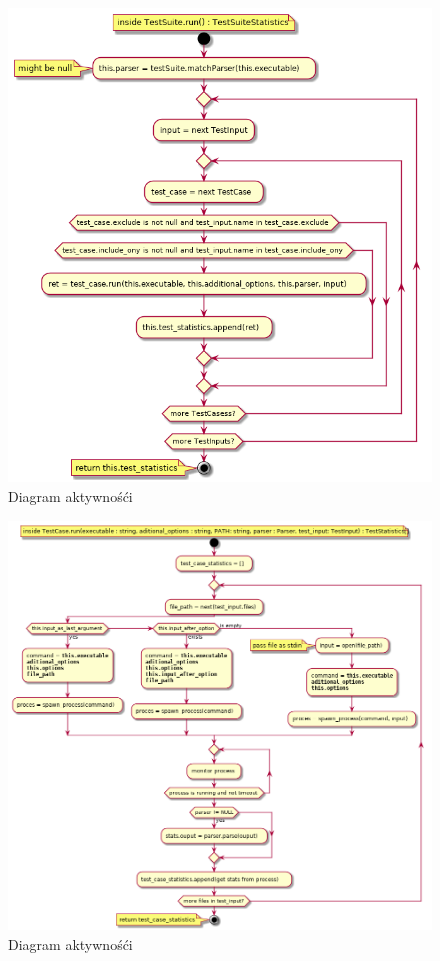 \documentclass[a4paper,12pt]{article}
\begin{document}
\begin{figure}[H]
  \centering
  \includegraphics[width=\textwidth]{benchmark/activity_diagrams/test_suite_run.png}
  \caption{Diagram aktywnośći}
\end{figure}

\begin{figure}[H]
  \centering
  \includegraphics[width=\textwidth]{benchmark/activity_diagrams/test_case_run.png}
  \caption{Diagram aktywnośći}
\end{figure}
\end{document}
